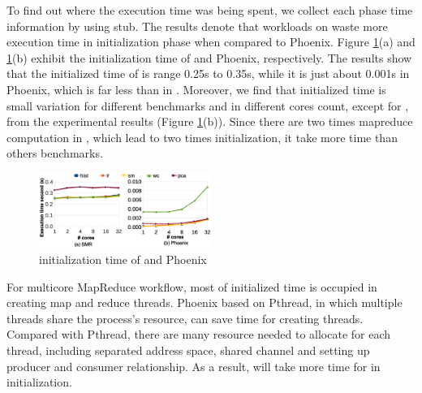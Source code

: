 To find out where the execution time was being spent, we collect each phase time information by using stub. 
The results denote that workloads on \myds waste more execution time in initialization phase when compared to Phoenix.
Figure \ref{fig:env:init}(a) and \ref{fig:env:init}(b) exhibit the initialization time of \myds and Phoenix, respectively.
The results show that the initialized time of \myds is range 0.25s to 0.35s, while it is just about 0.001s in Phoenix, which is far less than in \myds.
Moreover, we find that initialized time is small variation for different benchmarks and in different cores count, except for , from the experimental results (Figure \ref{fig:env:init}(b)).
Since there are two times mapreduce computation in , which lead to two times initialization, it take more time than others benchmarks.
\begin{figure}[!h!t]  
	\centering
	\includegraphics[width=0.5\textwidth]{eps/env_init.eps}
	\caption{initialization time of \myds and Phoenix}
	\label{fig:env:init}
\end{figure}


For multicore MapReduce workflow, most of initialized time is occupied in creating map and reduce threads.
Phoenix based on Pthread, in which multiple threads share the process's resource, can save time for creating threads.
Compared with Pthread, there are many resource needed to allocate for each \myth thread, including separated address space, shared channel and setting up producer and consumer relationship.
As a result, \myds will take more time for in initialization.

